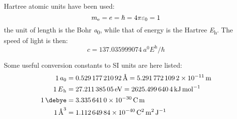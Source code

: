 Hartree atomic units have been used:~\autocite{Whiffen1978-xx}
\begin{equation*}
 \si{\electronmass} = \si{\elementarycharge} = \hslash = 4\pi\diel_0 = 1
\end{equation*}
the unit of length is the Bohr \si{\bohr}, while that of energy is the Hartree \si{\hartree}.
The speed of light is then:
\begin{equation*}
 c = \SI{137.035999074}{\bohr\hartree\per\planckbar}
\end{equation*}

Some useful conversion constants to SI units are here
listed:~\autocite{Mohr2012-zc}
\begin{subequations}
 \begin{align*}
  \SI{1}{\bohr} &= \SI{0.52917721092}{\angstrom} = \SI{5.2917721092e-11}{\meter} \\
  \SI{1}{\hartree} &= \SI{27.21138505}{\electronvolt} = \SI{2625.4996404}{\kilo\joule\per\mole} \\
  \SI{1}{\debye} &= \SI{3.3356410E-30}{\coulomb\meter} \\
  \SI{1}{\angstrom\cubed} &= \SI{1.11264984E-40}{\coulomb\squared\meter\squared\per\joule}
 \end{align*}
\end{subequations}

